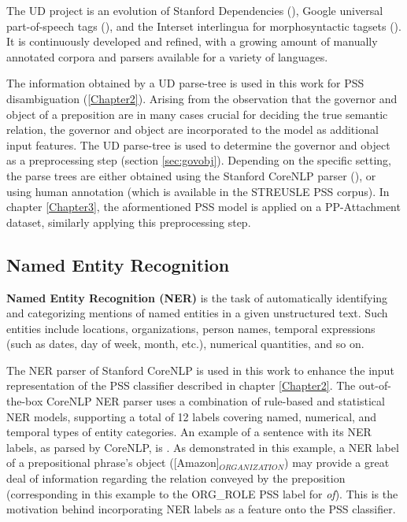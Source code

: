 The UD project is an evolution of Stanford Dependencies (\cite{de-marneffe-etal-14-universal}), Google universal part-of-speech tags (\cite{37072}), and the Interset interlingua for morphosyntactic tagsets (\cite{Zeman08ReusableTC}). It is continuously developed and refined, with a growing amount of manually annotated corpora and parsers available for a variety of languages. 

The information obtained by a UD parse-tree is used in this work for PSS disambiguation (\ref{Chapter2}). Arising from the observation that the governor and object of a preposition are in many cases crucial for deciding the true semantic relation, the governor and object are incorporated to the model as additional input features. The UD parse-tree is used to determine the governor and object as a preprocessing step (section \ref{sec:govobj}). Depending on the specific setting, the parse trees are either obtained using the Stanford CoreNLP parser (\cite{manning14stanford}), or using human annotation (which is available in the STREUSLE PSS corpus). In chapter \ref{Chapter3}, the aformentioned PSS model is applied on a PP-Attachment dataset, similarly applying this preprocessing step.

\subsection{Named Entity Recognition}
\textbf{Named Entity Recognition (NER)} is the task of automatically identifying and categorizing mentions of named entities in a given unstructured text. Such entities include locations, organizations, person names, temporal expressions (such as dates, day of week, month, etc.), numerical quantities, and so on.

The NER parser of Stanford CoreNLP is used in this work to enhance the input representation of the PSS classifier described in chapter \ref{Chapter2}. The out-of-the-box CoreNLP NER parser uses a combination of rule-based and statistical NER models, supporting a total of 12 labels covering named, numerical, and temporal types of entity categories. An example of a sentence with its NER labels, as parsed by CoreNLP, is . As demonstrated in this example, a NER label of a prepositional phrase's object ([Amazon]$_{ORGANIZATION}$) may provide a great deal of information regarding the relation conveyed by the preposition (corresponding in this example to the ORG\_ROLE PSS label for \emph{of}). This is the motivation behind incorporating NER labels as a feature onto the PSS classifier.

